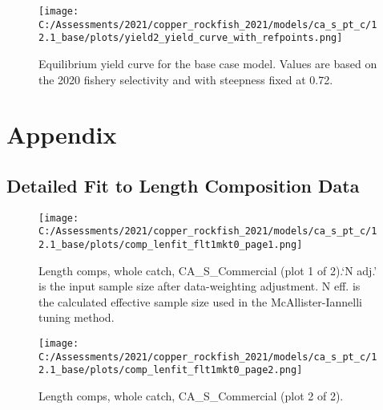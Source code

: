 \documentclass[11pt,
  english,
  a4paper,
]{article}
\begin{document}
\tagmcend\tagstructend


\begin{figure}
\centering
\texttt{[image: C:/Assessments/2021/copper\_rockfish\_2021/models/ca\_s\_pt\_c/12.1\_base/plots/yield2\_yield\_curve\_with\_refpoints.png]}
\caption{Equilibrium yield curve for the base case model. Values are based on the 2020 fishery selectivity and with steepness fixed at 0.72.\label{fig:yield}}
\end{figure}

\tagmcend\tagstructend

\clearpage


\hypertarget{appendix}{%
\section{Appendix}\label{appendix}}

\leavevmode\tagmcend\tagstructend


\hypertarget{length-fit}{%
\subsection{Detailed Fit to Length Composition Data}\label{length-fit}}

\leavevmode\tagmcend\tagstructend


\begin{figure}
\centering
\texttt{[image: C:/Assessments/2021/copper\_rockfish\_2021/models/ca\_s\_pt\_c/12.1\_base/plots/comp\_lenfit\_flt1mkt0\_page1.png]}
\caption{Length comps, whole catch, CA\_S\_Commercial (plot 1 of 2).`N adj.' is the input sample size after data-weighting adjustment. N eff. is the calculated effective sample size used in the McAllister-Iannelli tuning method.\label{fig:comp_lenfit_flt1mkt0_page1}}
\end{figure}

\tagmcend\tagstructend


\begin{figure}
\centering
\texttt{[image: C:/Assessments/2021/copper\_rockfish\_2021/models/ca\_s\_pt\_c/12.1\_base/plots/comp\_lenfit\_flt1mkt0\_page2.png]}
\caption{Length comps, whole catch, CA\_S\_Commercial (plot 2 of 2).\label{fig:comp_lenfit_flt1mkt0_page2}}
\end{figure}
\end{document}
